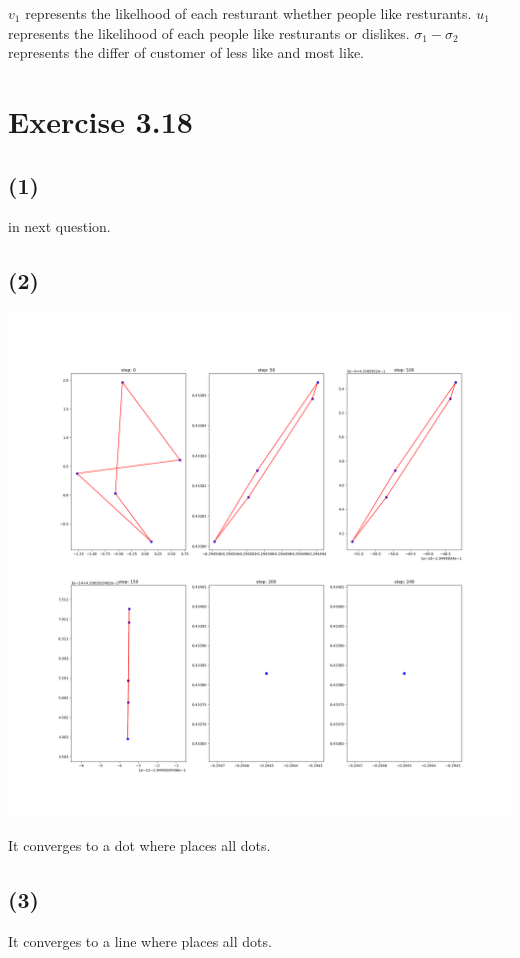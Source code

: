 \documentclass[a4paper, 11pt]{article}
\begin{document}
$v_1$ represents the likelhood of each resturant whether people like resturants.
$u_1$ represents the likelihood of each people like resturants or dislikes.
$\sigma_1 - \sigma_2$ represents the differ of customer of less like and most like.

\section*{Exercise 3.18}

\subsection*{(1)}
in next question.
\subsection*{(2)}

\includegraphics[scale=0.3]{18-2.png}

It converges to a dot where places all dots.

\subsection*{(3)}

It converges to a line where places all dots.
\end{document}
